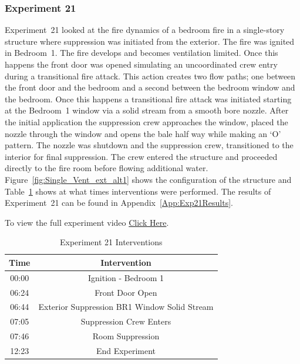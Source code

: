 \documentclass[12pt,oneside]{book}
\begin{document}
\subsubsection{Experiment 21}
Experiment~21 looked at the fire dynamics of a bedroom fire in a single-story structure where suppression was initiated from the exterior. The fire was ignited in Bedroom~1. The fire develops and becomes ventilation limited. Once this happens the front door was opened simulating an uncoordinated crew entry during a transitional fire attack. This action creates two flow paths; one between the front door and the bedroom and a second between the bedroom window and the bedroom. Once this happens a transitional fire attack was initiated starting at the Bedroom~1 window via a solid stream from a smooth bore nozzle. After the initial application the suppression crew approaches the window, placed the nozzle through the window and opens the bale half way while making an `O' pattern. The nozzle was shutdown and the suppression crew, transitioned to the interior for final suppression. The crew entered the structure and proceeded directly to the fire room before flowing additional water. Figure~\ref{fig:Single_Vent_ext_alt1} shows the configuration of the structure and Table~\ref{Table:Exp21Interventions} shows at what times interventions were performed. The results of Experiment~21 can be found in Appendix~\ref{App:Exp21Results}. 

To view the full experiment video \href{https://player.vimeo.com/video/170499627?autoplay=1}{Click Here}.

\begin{table}[H]
	\centering
	\caption{Experiment 21 Interventions}
	\begin{tabular}{|c|c|} 
		\hline
		Time & Intervention \\ \hline \hline
		00:00 & Ignition - Bedroom 1 \\ \hline
		06:24 & Front Door Open \\ \hline
		06:44 & Exterior Suppression BR1 Window Solid Stream \\ \hline
		07:05 & Suppression Crew Enters\\ \hline
		07:46 & Room Suppression \\ \hline 
		12:23 & End Experiment\\ \hline
	\end{tabular}
	\label{Table:Exp21Interventions}
\end{table}

\FloatBarrier
\end{document}

